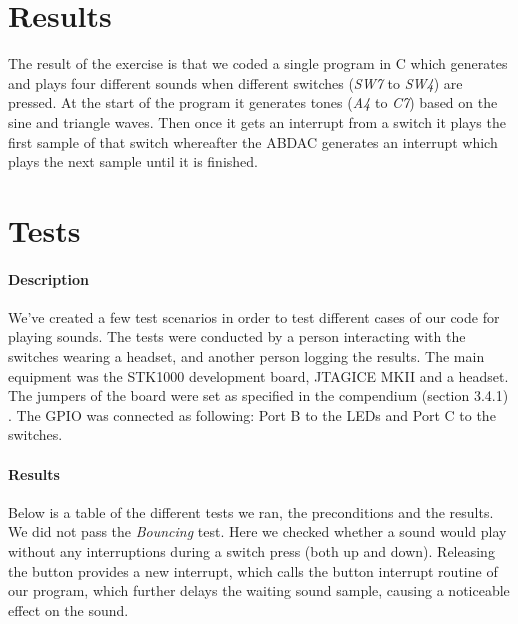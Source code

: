 \documentclass[a4paper,11pt]{article}
\begin{document}
\section{Results}
The result of the exercise is that we coded a single program in C which generates and plays four different sounds when different switches (\emph{SW7} to \emph{SW4}) are pressed. At the start of the program it generates tones (\emph{A4} to \emph{C7}) based on the sine and triangle waves. Then once it gets an interrupt from a switch it plays the first sample of that switch whereafter the ABDAC generates an interrupt which plays the next sample until it is finished.

\section{Tests}
\paragraph{Description}
We've created a few test scenarios in order to test different cases of our code for playing sounds. The tests were conducted by a person interacting with the switches wearing a headset, and another person logging the results. The main equipment was the STK1000 development board, JTAGICE MKII and a headset. The jumpers of the board were set as specified in the compendium (section 3.4.1) \cite{komp}. The GPIO was connected as following: Port B to the LEDs and Port C to the switches.

\paragraph{Results}
Below is a table of the different tests we ran, the preconditions and the results. We did not pass the \emph{Bouncing} test. Here we checked whether a sound would play without any interruptions during a switch press (both up and down). Releasing the button provides a new interrupt, which calls the button interrupt routine of our program, which further delays the waiting sound sample, causing a noticeable effect on the sound.
\end{document}
